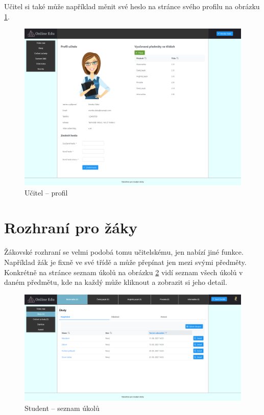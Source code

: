 \documentclass[twoside]{ctuthesis}
\theoremstyle{plain}
\theoremstyle{definition}
\theoremstyle{note}
\begin{document}
Učitel si také může například měnit své heslo na stránce svého profilu na obrázku \ref{ref:ucitel-profil}.
\begin{figure}[H]
    \caption{Učitel -- profil}
    \label{ref:ucitel-profil}
    \centering
    \includegraphics[width=\textwidth]{images/app_screenshots/ucitel_profil}
\end{figure}


\section{Rozhraní pro žáky}

Žákovské rozhraní se velmi podobá tomu učitelskému, jen nabízí jiné funkce. Například žák je fixně ve své třídě a může přepínat jen mezi svými předměty. Konkrétně na stránce seznam úkolů na obrázku \ref{ref:student-seznam-ukolu} vidí seznam všech úkolů v daném předmětu, kde na každý může kliknout a zobrazit si jeho detail.
\begin{figure}[H]
    \caption{Student -- seznam úkolů}
    \label{ref:student-seznam-ukolu}
    \centering
    \includegraphics[width=\textwidth]{images/app_screenshots/zak_nove_ukoly}
\end{figure}
\end{document}
